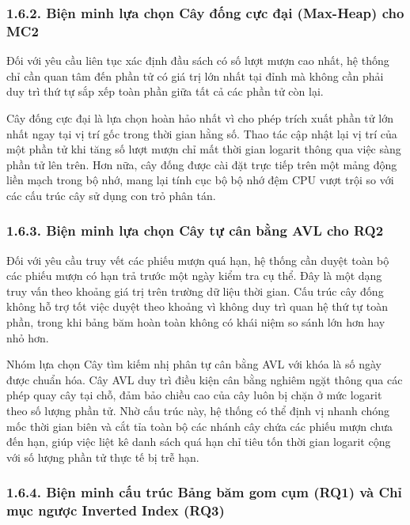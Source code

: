 \documentclass[14pt,a4paper]{extarticle}
\begin{document}
\subsubsection*{1.6.2. Biện minh lựa chọn Cây đống cực đại (Max-Heap) cho MC2}

Đối với yêu cầu liên tục xác định đầu sách có số lượt mượn cao nhất, hệ thống chỉ cần quan tâm đến phần tử có giá trị lớn nhất tại đỉnh mà không cần phải duy trì thứ tự sắp xếp toàn phần giữa tất cả các phần tử còn lại.

Cây đống cực đại là lựa chọn hoàn hảo nhất vì cho phép trích xuất phần tử lớn nhất ngay tại vị trí gốc trong thời gian hằng số. Thao tác cập nhật lại vị trí của một phần tử khi tăng số lượt mượn chỉ mất thời gian logarit thông qua việc sàng phần tử lên trên. Hơn nữa, cây đống được cài đặt trực tiếp trên một mảng động liền mạch trong bộ nhớ, mang lại tính cục bộ bộ nhớ đệm CPU vượt trội so với các cấu trúc cây sử dụng con trỏ phân tán.

\subsubsection*{1.6.3. Biện minh lựa chọn Cây tự cân bằng AVL cho RQ2}

Đối với yêu cầu truy vết các phiếu mượn quá hạn, hệ thống cần duyệt toàn bộ các phiếu mượn có hạn trả trước một ngày kiểm tra cụ thể. Đây là một dạng truy vấn theo khoảng giá trị trên trường dữ liệu thời gian. Cấu trúc cây đống không hỗ trợ tốt việc duyệt theo khoảng vì không duy trì quan hệ thứ tự toàn phần, trong khi bảng băm hoàn toàn không có khái niệm so sánh lớn hơn hay nhỏ hơn.

Nhóm lựa chọn Cây tìm kiếm nhị phân tự cân bằng AVL với khóa là số ngày được chuẩn hóa. Cây AVL duy trì điều kiện cân bằng nghiêm ngặt thông qua các phép quay cây tại chỗ, đảm bảo chiều cao của cây luôn bị chặn ở mức logarit theo số lượng phần tử. Nhờ cấu trúc này, hệ thống có thể định vị nhanh chóng mốc thời gian biên và cắt tỉa toàn bộ các nhánh cây chứa các phiếu mượn chưa đến hạn, giúp việc liệt kê danh sách quá hạn chỉ tiêu tốn thời gian logarit cộng với số lượng phần tử thực tế bị trễ hạn.

\subsubsection*{1.6.4. Biện minh cấu trúc Bảng băm gom cụm (RQ1) và Chỉ mục ngược Inverted Index (RQ3)}
\end{document}
